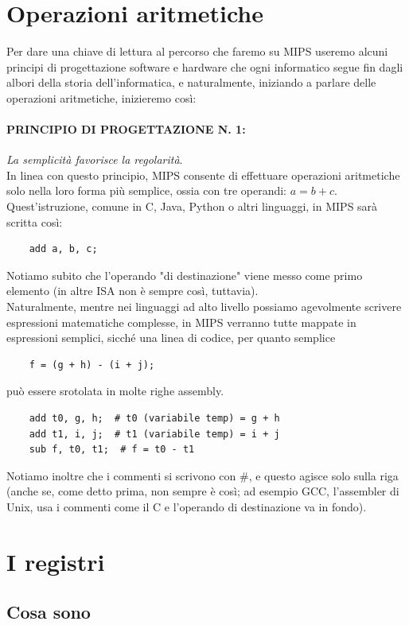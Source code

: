\documentclass[class=book, crop=false]{standalone}
\begin{document}
\section{Operazioni aritmetiche}
Per dare una chiave di lettura al percorso che faremo su MIPS useremo alcuni principi di progettazione software e hardware che ogni informatico segue fin dagli albori della storia dell'informatica, e naturalmente, iniziando a parlare delle operazioni aritmetiche,  inizieremo così:

\paragraph{PRINCIPIO DI PROGETTAZIONE N. 1:}
\emph{La semplicità favorisce la regolarità}.\\

In linea con questo principio, MIPS consente di effettuare operazioni aritmetiche solo nella loro forma più semplice, ossia con tre operandi: \(a = b + c\).
Quest'istruzione, comune in C, Java, Python o altri linguaggi, in MIPS sarà scritta così:
\begin{verbatim}
	add a, b, c;
\end{verbatim}

Notiamo subito che l'operando "di destinazione" viene messo come primo elemento (in altre ISA non è sempre così, tuttavia).\\
Naturalmente, mentre nei linguaggi ad alto livello possiamo agevolmente scrivere espressioni matematiche complesse, in MIPS verranno tutte mappate in espressioni semplici, sicché una linea di codice, per quanto semplice
\begin{verbatim}
	f = (g + h) - (i + j);
\end{verbatim}
può essere srotolata in molte righe assembly.
\begin{verbatim}
	add t0, g, h;  # t0 (variabile temp) = g + h
	add t1, i, j;  # t1 (variabile temp) = i + j
	sub f, t0, t1;  # f = t0 - t1
\end{verbatim}
Notiamo inoltre che i commenti si scrivono con \#, e questo agisce solo sulla riga (anche se, come detto prima, non sempre è così; ad esempio GCC, l'assembler di Unix, usa i commenti come il C e l'operando di destinazione va in fondo).

\section{I registri}

\subsection{Cosa sono}
\end{document}
